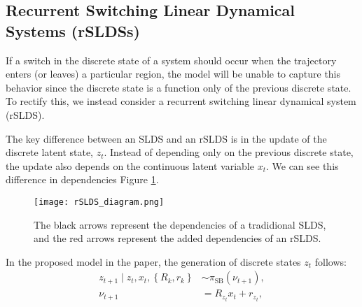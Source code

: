 
\subsection{Recurrent Switching Linear Dynamical Systems (rSLDSs)}

If a switch in the discrete state of a system should occur when the trajectory enters (or leaves) a particular region, the model will be unable to capture this behavior since the discrete state is a function only of the previous discrete state. To rectify this, we instead consider a recurrent switching linear dynamical system (rSLDS). 

The key difference between an SLDS and an rSLDS is in the update of the  discrete latent state, $z_t$. Instead of depending only on the previous discrete state, the update also depends on the continuous latent variable $x_t$. We can see this difference in dependencies Figure \ref{rSLDS}.

\begin{figure}[h!]
	\centering
	\texttt{[image: rSLDS\_diagram.png]}
	\caption{The black arrows represent the dependencies of a tradidional SLDS, and the red arrows represent the added dependencies of an rSLDS.}
	\label{rSLDS}
\end{figure}


In the proposed model in the paper, the generation of discrete states $z_{t}$ follows:
$$
\begin{aligned}
z_{t+1} \mid z_{t}, x_{t},\left\{R_{k}, r_{k}\right\} & \sim \pi_{\mathrm{SB}}\left(\nu_{t+1}\right), \\
\nu_{t+1} & =R_{z_{t}} x_{t}+r_{z_{t}},
\end{aligned}
$$

